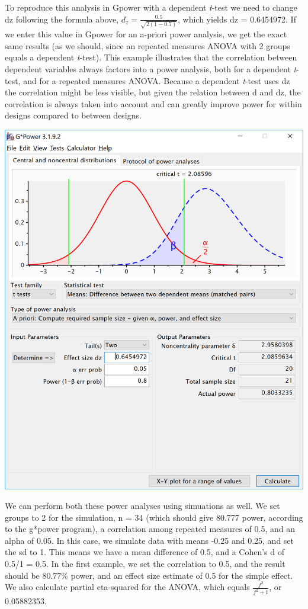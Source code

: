 \documentclass[]{book}
\begin{document}
To reproduce this analysis in Gpower with a dependent \emph{t}-test we need to change dz following the formula above, \(d_{z}=\frac{0.5}{\sqrt{2(1-0.7)}}\), which yields dz = 0.6454972. If we enter this value in Gpower for an a-priori power analysis, we get the exact same results (as we should, since an repeated measures ANOVA with 2 groups equals a dependent \emph{t}-test). This example illustrates that the correlation between dependent variables always factors into a power analysis, both for a dependent \emph{t}-test, and for a repeated measures ANOVA. Because a dependent \emph{t}-test uses dz the correlation might be less visible, but given the relation between d and dz, the correlation is always taken into account and can greatly improve power for within designs compared to between designs.

\includegraphics{screenshots/gpower_10.png}

We can perform both these power analyses using simuations as well. We set groups to 2 for the simulation, n = 34 (which should give 80.777 power, according to the g*power program), a correlation among repeated measures of 0.5, and an alpha of 0.05. In this case, we simulate data with means -0.25 and 0.25, and set the sd to 1. This means we have a mean difference of 0.5, and a Cohen's d of 0.5/1 = 0.5. In the first example, we set the correlation to 0.5, and the result should be 80.77\% power, and an effect size estimate of 0.5 for the simple effect. We also calculate partial eta-squared for the ANOVA, which equals \(\frac{f^2}{f^2+1}\), or 0.05882353.
\end{document}
